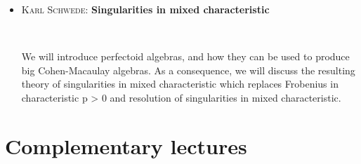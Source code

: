 \documentclass[12pt]{amsart}
\begin{document}
\begin{itemize}
\vfill


\item  \textsc{Karl Schwede:} \textbf{Singularities in mixed characteristic}

\

\noindent We will introduce perfectoid algebras, and how they can be used to
produce big Cohen-Macaulay algebras.  As a consequence, we will discuss the
resulting theory of singularities in mixed characteristic which replaces
Frobenius in characteristic p > 0 and resolution of singularities in mixed
characteristic.

\vfill

\end{itemize}

\vfill

\newpage

\section*{Complementary lectures}
\end{document}
